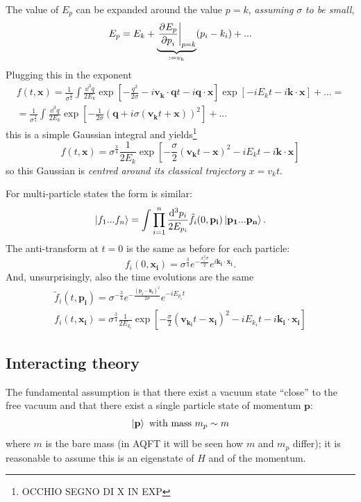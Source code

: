 The value of $E_p$ can be expanded around the value $p=k$, \textit{assuming}
$\sigma$ \textit{to be small},
\[
    E_p = E_k + \underbrace{\eval{\pdv[]{E_p}{p_i}}_{p=k}}_{:=v_k}(p_i-k_i)+...
\]
Plugging this in the exponent
\begin{gather*}
    f(t,\mathbf{x}) = \frac{1}{\sigma^{\frac{3}{4}}}\int \frac{\dd^3q}{2E_k}
    \exp\left[ -\frac{q^2}{2\sigma}-i\mathbf{v_k\cdot q}t - i\mathbf{q\cdot x}
    \right] \exp\left[ -iE_kt - i\mathbf{k\cdot x} \right]+...=\\=
    \frac{1}{\sigma^{\frac{3}{4}}} \int_{}^{} \frac{\dd^3q}{2E_k}
    \exp\left[ -\frac{1}{2\sigma}\left(\mathbf{q} + i\sigma(\mathbf{v_k}t+
    \mathbf{x})\right)^2 \right]+...
\end{gather*}
this is a simple Gaussian integral and yields\footnote{OCCHIO SEGNO DI X IN EXP}
\[
    f(t,\mathbf{x})=\sigma^{\frac{3}{4}}\frac{1}{2E_k}\exp\left[-\frac{\sigma}{2}
    \left(\mathbf{v_k}t-\mathbf{x}\right)^2 - iE_kt-i\mathbf{k\cdot x}\right]
\]
so this Gaussian is \textit{centred around its classical trajectory $x=v_kt$}.

For multi-particle states the form is similar:
\[
    \ket{f_1...f_n}=\int\prod_{i=1}^{n}\frac{\dd^3p_i}{2E_{p_i}}\tilde
    f_i(0,\mathbf{p_i}) \ket{\mathbf{p_1...p_n}}.
\]
The anti-transform at $t=0$ is the same as before for each particle:
\[
    f_i(0,\mathbf{x_i})=\sigma^{\frac{3}{4}}e^{-\frac{x_i^2\sigma}{2}}
    e^{i\mathbf{k_i\cdot x_i}}.
\]
And, unsurprisingly, also the time evolutions are the same
\begin{gather*}
    \tilde f_i(t,\mathbf{p_i})=\sigma^{-\frac{3}{4}}e^{-\frac{(\mathbf{p_i-k_i}
    )^2}{2\sigma}}e^{-iE_{p_i}t}\\
    f_i(t,\mathbf{x_i})=\sigma^{\frac{3}{4}}\frac{1}{2E_{k_i}}\exp\left[-\frac{
    \sigma}{2}\left(\mathbf{v_{k_i}}t-\mathbf{x_i}\right)^2 -
    iE_{k_i}t-i\mathbf{k_i\cdot x_i}\right]
\end{gather*}

\subsection{Interacting theory}
The fundamental assumption is that there exist a vacuum state ``close'' to the
free vacuum and that there exist a single particle state of momentum $\mathbf{p}$:
\[
    \ket{\mathbf{p}}\text{ with mass }m_p\sim m
\]
where $m$ is the bare mass (in AQFT it will be seen how $m$ and $m_p$ differ);
it is reasonable to assume this is an eigenstate of $H$ and of the momentum.

